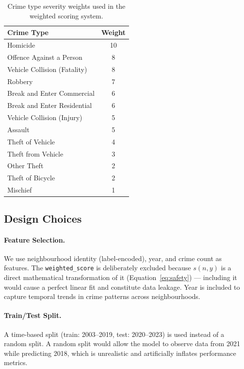 \documentclass{article}
\begin{document}
\begin{table}[H]
  \centering
  \caption{Crime type severity weights used in the weighted scoring system.}
  \label{tab:weights}
  \begin{tabular}{lc}
    \toprule
    \textbf{Crime Type} & \textbf{Weight} \\
    \midrule
    Homicide & 10 \\
    Offence Against a Person & 8 \\
    Vehicle Collision (Fatality) & 8 \\
    Robbery & 7 \\
    Break and Enter Commercial & 6 \\
    Break and Enter Residential & 6 \\
    Vehicle Collision (Injury) & 5 \\
    Assault & 5 \\
    Theft of Vehicle & 4 \\
    Theft from Vehicle & 3 \\
    Other Theft & 2 \\
    Theft of Bicycle & 2 \\
    Mischief & 1 \\
    \bottomrule
  \end{tabular}
\end{table}

\subsection{Design Choices}

\paragraph{Feature Selection.}
We use neighbourhood identity (label-encoded), year, and crime count as features.
The \texttt{weighted\_score} is deliberately excluded because $s(n,y)$ is a direct
mathematical transformation of it (Equation~\ref{eq:safety}) --- including it
would cause a perfect linear fit and constitute data leakage. Year is included to
capture temporal trends in crime patterns across neighbourhoods.

\paragraph{Train/Test Split.}
A time-based split (train: 2003--2019, test: 2020--2023) is used instead of a
random split. A random split would allow the model to observe data from 2021 while
predicting 2018, which is unrealistic and artificially inflates performance metrics.
\end{document}
